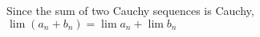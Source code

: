 \documentclass[preview]{standalone}
\begin{document}
\begin{center}
Since the sum of two Cauchy sequences is Cauchy,\\$\lim (a_n + b_n) = \lim a_n + \lim b_n$
\end{center}
\end{document}
